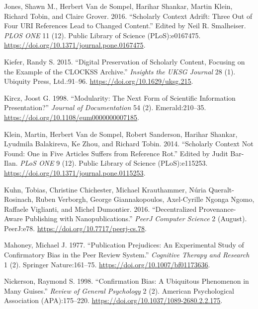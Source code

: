 \documentclass[a4paper]{article}
\begin{document}
\leavevmode\hypertarget{ref-doi:10.1371ux2fjournal.pone.0167475}{}%
Jones, Shawn M., Herbert Van de Sompel, Harihar Shankar, Martin Klein,
Richard Tobin, and Claire Grover. 2016. ``Scholarly Context Adrift:
Three Out of Four URI References Lead to Changed Content.'' Edited by
Neil R. Smalheiser. \emph{PLOS ONE} 11 (12). Public Library of Science
(PLoS):e0167475. \url{https://doi.org/10.1371/journal.pone.0167475}.

\leavevmode\hypertarget{ref-doi:10.1629ux2fuksg.215}{}%
Kiefer, Randy S. 2015. ``Digital Preservation of Scholarly Content,
Focusing on the Example of the CLOCKSS Archive.'' \emph{Insights the
UKSG Journal} 28 (1). Ubiquity Press, Ltd.:91--96.
\url{https://doi.org/10.1629/uksg.215}.

\leavevmode\hypertarget{ref-doi:10.1108ux2feum0000000007185}{}%
Kircz, Joost G. 1998. ``Modularity: The Next Form of Scientific
Information Presentation?'' \emph{Journal of Documentation} 54 (2).
Emerald:210--35. \url{https://doi.org/10.1108/eum0000000007185}.

\leavevmode\hypertarget{ref-doi:10.1371ux2fjournal.pone.0115253}{}%
Klein, Martin, Herbert Van de Sompel, Robert Sanderson, Harihar Shankar,
Lyudmila Balakireva, Ke Zhou, and Richard Tobin. 2014. ``Scholarly
Context Not Found: One in Five Articles Suffers from Reference Rot.''
Edited by Judit Bar-Ilan. \emph{PLoS ONE} 9 (12). Public Library of
Science (PLoS):e115253.
\url{https://doi.org/10.1371/journal.pone.0115253}.

\leavevmode\hypertarget{ref-doi:10.7717ux2fpeerj-cs.78}{}%
Kuhn, Tobias, Christine Chichester, Michael Krauthammer, Núria
Queralt-Rosinach, Ruben Verborgh, George Giannakopoulos, Axel-Cyrille
Ngonga Ngomo, Raffaele Viglianti, and Michel Dumontier. 2016.
``Decentralized Provenance-Aware Publishing with Nanopublications.''
\emph{PeerJ Computer Science} 2 (August). PeerJ:e78.
\url{https://doi.org/10.7717/peerj-cs.78}.

\leavevmode\hypertarget{ref-doi:10.1007ux2fbf01173636}{}%
Mahoney, Michael J. 1977. ``Publication Prejudices: An Experimental
Study of Confirmatory Bias in the Peer Review System.'' \emph{Cognitive
Therapy and Research} 1 (2). Springer Nature:161--75.
\url{https://doi.org/10.1007/bf01173636}.

\leavevmode\hypertarget{ref-doi:10.1037ux2f1089-2680.2.2.175}{}%
Nickerson, Raymond S. 1998. ``Confirmation Bias: A Ubiquitous Phenomenon
in Many Guises.'' \emph{Review of General Psychology} 2 (2). American
Psychological Association (APA):175--220.
\url{https://doi.org/10.1037/1089-2680.2.2.175}.
\end{document}
